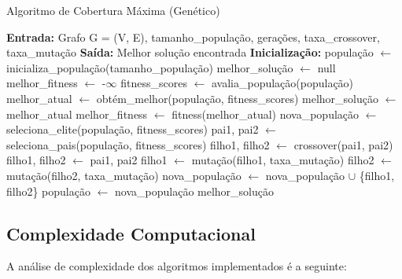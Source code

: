 \documentclass[12pt, a4paper]{report}
\begin{document}
\begin{algorithm}[H]
\caption{Algoritmo de Cobertura Máxima (Genético)}
\begin{algorithmic}[1]
\State \textbf{Entrada:} Grafo G = (V, E), tamanho\_população, gerações, taxa\_crossover, taxa\_mutação
\State \textbf{Saída:} Melhor solução encontrada
\Statex
\State \textbf{Inicialização:}
\State população $\gets$ inicializa\_população(tamanho\_população)
\State melhor\_solução $\gets$ null
\State melhor\_fitness $\gets$ -$\infty$
\Statex
{}
    \State fitness\_scores $\gets$ avalia\_população(população)
    \State melhor\_atual $\gets$ obtém\_melhor(população, fitness\_scores)
        \State melhor\_solução $\gets$ melhor\_atual
        \State melhor\_fitness $\gets$ fitness(melhor\_atual)
    \EndIf
    \State nova\_população $\gets$ seleciona\_elite(população, fitness\_scores)
        \State pai1, pai2 $\gets$ seleciona\_pais(população, fitness\_scores)
            \State filho1, filho2 $\gets$ crossover(pai1, pai2)
        \Else
            \State filho1, filho2 $\gets$ pai1, pai2
        \EndIf
        \State filho1 $\gets$ mutação(filho1, taxa\_mutação)
        \State filho2 $\gets$ mutação(filho2, taxa\_mutação)
        \State nova\_população $\gets$ nova\_população $\cup$ \{filho1, filho2\}
    \EndWhile
    \State população $\gets$ nova\_população
\EndFor
\State \Return melhor\_solução
\end{algorithmic}
\end{algorithm}

\subsection{Complexidade Computacional}
A análise de complexidade dos algoritmos implementados é a seguinte:
\end{document}
